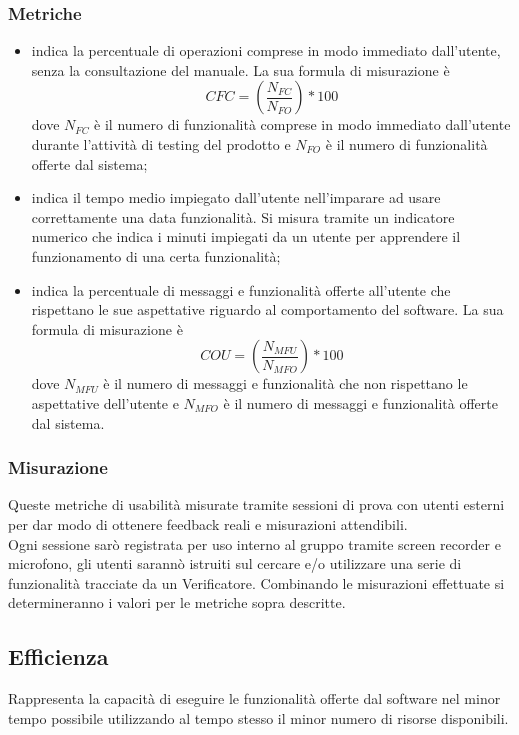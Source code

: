 \documentclass[PianoDiQualifica.tex]{subfiles}
\begin{document}
\subsubsection{Metriche}
\begin{itemize}
	\item {} indica la percentuale di operazioni comprese in modo immediato dall'utente, senza la consultazione del manuale.  La sua formula di misurazione è \[CFC=(\frac{N_{FC}}{N_{FO}})*100\] dove $ N_{FC} $ è il numero di funzionalità comprese in modo immediato dall'utente durante l'attività di testing del prodotto e $ N_{FO} $ è il numero di funzionalità offerte dal sistema;
	\item {} indica il tempo medio impiegato dall'utente nell'imparare ad usare correttamente una data funzionalità. Si misura tramite un indicatore numerico che indica i minuti impiegati da un utente per apprendere il funzionamento di una certa funzionalità;
	\item {} indica la percentuale di messaggi e funzionalità offerte all'utente che rispettano le sue aspettative riguardo al comportamento del software.  La sua formula di misurazione è \[COU=(\frac{N_{MFU}}{N_{MFO}})*100\] dove $ N_{MFU} $ è il numero di messaggi e funzionalità che non rispettano le aspettative dell'utente e $ N_{MFO} $ è il numero di messaggi e funzionalità offerte dal sistema.	
\end{itemize}	
\subsubsection{Misurazione}
Queste metriche di usabilità misurate tramite sessioni di prova con utenti esterni per dar modo di ottenere feedback reali e misurazioni attendibili.\\ Ogni sessione sarò registrata per uso interno al gruppo tramite screen recorder e microfono, gli utenti sarannò istruiti sul cercare e/o utilizzare una serie di funzionalità tracciate da un Verificatore.
Combinando le misurazioni effettuate si determineranno i valori per le metriche sopra descritte.

\subsection{Efficienza}
Rappresenta la capacità di eseguire le funzionalità offerte dal software nel minor tempo possibile utilizzando al tempo stesso il minor numero di risorse disponibili.
\end{document}
